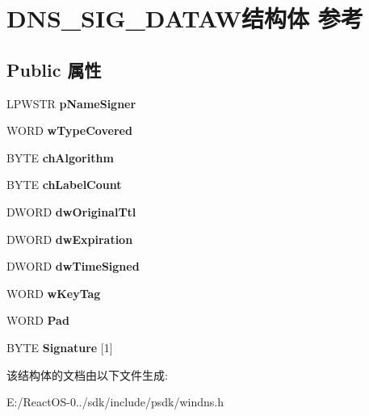 \hypertarget{struct_d_n_s___s_i_g___d_a_t_a_w}{}\section{D\+N\+S\+\_\+\+S\+I\+G\+\_\+\+D\+A\+T\+A\+W结构体 参考}
\label{struct_d_n_s___s_i_g___d_a_t_a_w}
\subsection*{Public 属性}
\begin{DoxyCompactItemize}
\item 
\mbox{\label{struct_d_n_s___s_i_g___d_a_t_a_w_a57b5a258f9c5650d733b9b5ba00fc569}} 
L\+P\+W\+S\+TR {\bfseries p\+Name\+Signer}
\item 
\mbox{\label{struct_d_n_s___s_i_g___d_a_t_a_w_a6df77245509af4f3b56cad49b081962b}} 
W\+O\+RD {\bfseries w\+Type\+Covered}
\item 
\mbox{\label{struct_d_n_s___s_i_g___d_a_t_a_w_a6d6e33b1f0d860cec88da72ba22919bd}} 
B\+Y\+TE {\bfseries ch\+Algorithm}
\item 
\mbox{\label{struct_d_n_s___s_i_g___d_a_t_a_w_ad5f603a6a9f831940dda55b9130f2d37}} 
B\+Y\+TE {\bfseries ch\+Label\+Count}
\item 
\mbox{\label{struct_d_n_s___s_i_g___d_a_t_a_w_abc62b502ca70c67cf73e8a540b54dac2}} 
D\+W\+O\+RD {\bfseries dw\+Original\+Ttl}
\item 
\mbox{\label{struct_d_n_s___s_i_g___d_a_t_a_w_ad148410de4e0c9fcd236a8076553da60}} 
D\+W\+O\+RD {\bfseries dw\+Expiration}
\item 
\mbox{\label{struct_d_n_s___s_i_g___d_a_t_a_w_aceb82d0ad001525c44e3b1ad00ddf9eb}} 
D\+W\+O\+RD {\bfseries dw\+Time\+Signed}
\item 
\mbox{\label{struct_d_n_s___s_i_g___d_a_t_a_w_a743d662122e2bbd1dacaa23198a68cd2}} 
W\+O\+RD {\bfseries w\+Key\+Tag}
\item 
\mbox{\label{struct_d_n_s___s_i_g___d_a_t_a_w_ab62f7446a76fe4fccac7e7de291f1189}} 
W\+O\+RD {\bfseries Pad}
\item 
\mbox{\label{struct_d_n_s___s_i_g___d_a_t_a_w_ac9d1846aa7be93f49255d5ee43ce7d9d}} 
B\+Y\+TE {\bfseries Signature} \mbox{[}1\mbox{]}
\end{DoxyCompactItemize}


该结构体的文档由以下文件生成\+:\begin{DoxyCompactItemize}
\item 
E\+:/\+React\+O\+S-\/0../sdk/include/psdk/windns.\+h\end{DoxyCompactItemize}

